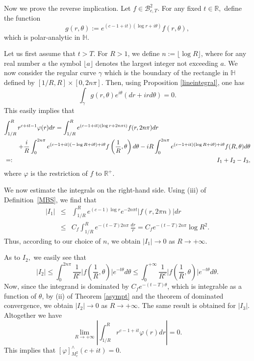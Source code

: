 \documentclass[amsmath,english,a4paper,graphicx,12pt]{article}
\newcommand{\R}{\mathbb{R}}
\begin{document}
Now we prove the reverse implication.  Let $f\in \mathscr{B}^2_{c,T}$. For any fixed $t \in \mathbb{R},$  define the function
$$g(r, \theta) := e^{(c-1+it)(\log r +i\theta)}f(r, \theta),$$
which is polar-analytic in $\mathbb{H}.$ 

Let us first assume that $t>T.$ For $R>1$, we define $n:=\lfloor \log R\rfloor$, where for any real number $a$ the symbol $\lfloor a\rfloor$ denotes the
largest integer not exceeding $a$.  We now consider the regular curve $\gamma$ which is the boundary of the rectangle 
in $\mathbb{H}$ defined by $[1/R, R] \times [0, 2n\pi].$ Then, using Proposition \ref{lineintegral}, one has
$$\int_\gamma g(r,\theta) e^{i\theta}(dr + ird \theta) = 0.$$
This easily implies that 
\begin{eqnarray*}
\lefteqn{\int_{1/R}^R r^{c+it -1}\varphi(r)dr = \int_{1/R}^R e^{(c-1+it)(\log r + 2n\pi i)}f(r, 2n\pi)dr } \\ 
& & +\frac{i}{R}\int_0^{2n \pi} e^{(c-1+it)(-\log R +i\theta) + i\theta}f\left(\frac{1}{R}, \theta\right) d\theta -iR\int_0^{2n \pi}e^{(c-1+it)(\log R +i\theta) + i\theta}f(R, \theta)d\theta\\
&=:& I_1 + I_2 -I_3,
\end{eqnarray*}
where $\varphi$ is the restriction of $f$ to $\R^+$.

We now estimate the integrals on the right-hand side.
Using (iii) of Definition~\ref{MBS}, we find that
\begin{eqnarray*}
|I_1| &\leq& \int_{1/R}^R e^{(c-1)\log r}e^{-2n\pi t}|f(r, 2\pi n)|dr \\ &\leq& 
C_f\int_{1/R}^R e^{-(t-T)2n\pi}\,\frac{dr}{r} = C_fe^{-(t-T)2n\pi} \log R^2.
\end{eqnarray*}
Thus, according to our choice of $n$, we obtain $|I_1|\rightarrow 0$ as $R\rightarrow +\infty.$

As to $I_2,$ we easily see that
$$|I_2| \leq \int_0^{2n\pi} \frac{1}{R^c}\bigg|f\left(\frac{1}{R}, \theta\right)\bigg| e^{-t\theta}d\theta \leq
\int_0^{+\infty} \frac{1}{R^c}\bigg|f\left(\frac{1}{R}, \theta\right)\bigg| e^{-t\theta}d\theta.
$$
Now, since  the integrand is dominated by $C_f e^{-(t-T)\theta}$, which is integrable as a function of $\theta$, by (ii) of Theorem \ref{asympt} 
and the theorem of dominated convergence, we obtain $|I_2| \rightarrow 0$ as $R\rightarrow +\infty.$ The same result is obtained for $|I_3|$. 
Altogether we have
$$\lim_{R \rightarrow +\infty}\left|\int_{1/R}^R r^{c-1+it}\varphi(r)dr\right| = 0.$$
This implies that $[\varphi]^\wedge_{M^2_c}(c+it) = 0.$ 
\end{document}
